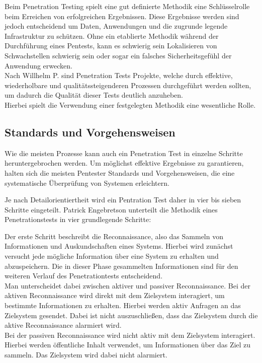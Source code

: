 Beim Penetration Testing spielt eine gut definierte Methodik eine Schlüsselrolle beim Erreichen von erfolgreichen Ergebnissen. Diese Ergebnisse werden sind jedoch entscheidend um Daten, Anwendungen und die zugrunde legende Infrastruktur zu schützen.
Ohne ein etablierte Methodik während der Durchführung eines Pentests, kann es schwierig sein Lokalisieren von Schwachstellen schwierig sein oder sogar ein falsches Sicherheitsgefühl der Anwendung erwecken. \\
Nach Willhelm P. sind Penetration Tests Projekte, welche durch effektive, wiederholbare und qualitätssteigenderen Prozessen durchgeführt werden sollten, um dadurch die Qualität dieser Tests deutlich anzuheben. \\
Hierbei spielt die Verwendung einer festgelegten Methodik eine wesentliche Rolle.

\subsection{Standards und Vorgehensweisen}

Wie die meisten Prozesse kann auch ein Penetration Test in einzelne Schritte heruntergebrochen werden. 
Um möglichst effektive Ergebnisse zu garantieren, halten sich die meisten Pentester Standards und Vorgehensweisen, die eine systematische Überprüfung von Systemen erleichtern. 

Je nach Detailorientiertheit wird ein Pentration Test daher in vier bis sieben Schritte eingeteilt. 
Patrick Engebretson unterteilt die Methodik eines Penetrationstests in vier grundlegende Schritte: \cite{B1} 

Der erste Schritt beschreibt die Reconnaissance, also das Sammeln von Informationen und Auskundschaften eines Systems. Hierbei wird zunächst versucht jede mögliche Information über eine System zu erhalten und abzuspeichern. Die in dieser Phase gesammelten Informationen sind für den weiteren Verlauf des Penetrationtests entscheidend. \cite{B1}\\
Man unterscheidet dabei zwischen aktiver und passiver Reconnaissance.
Bei der aktiven Reconnaissance wird direkt mit dem Zielsystem interagiert, um bestimmte Informationen zu erhalten. Hierbei werden aktiv Anfragen an das Zielsystem gesendet. Dabei ist nicht auszuschließen, dass das Zielsystem durch die aktive Reconnaissance alarmiert wird. \\
Bei der passiven Reconnaissance wird nicht aktiv mit dem Zielsystem interagiert. Hierbei werden öffentliche Inhalt verwendet, um Informationen über das Ziel zu sammeln. Das Zielsystem wird dabei nicht alarmiert. \cite{B1} \cite{B4}


